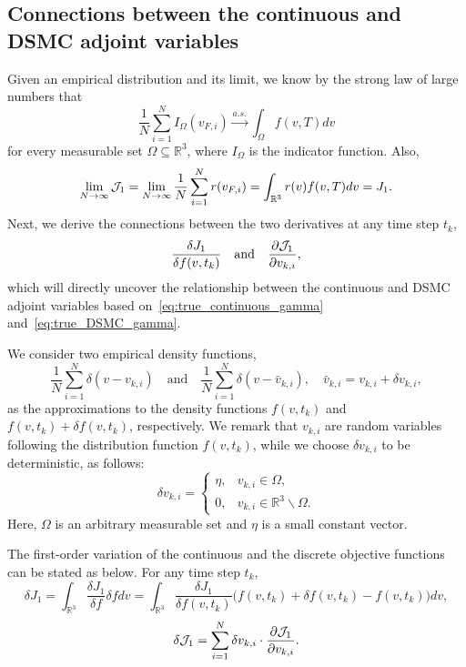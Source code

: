 \documentclass[times,final,nopreprintline]{elsarticle}
\newcommand{\bbR}{\mathbb R} \newcommand{\bbS}{\mathbb S}
\newcommand{\Rthree}{{\bbR^3}}
\begin{document}


\subsection{Connections between the continuous and DSMC adjoint variables}\label{sec:connections}
Given an empirical distribution and its limit, we know by the strong law of large numbers that
\begin{equation*}%
\frac{1}{N}\sum_{i=1}^N I_\Omega(v_{F,i}) \xrightarrow[]{a.s.} \int_\Omega f(v,T) dv
\end{equation*}
for every measurable set $\Omega\subseteq \Rthree$, where $I_\Omega$ is the indicator function. Also,
\begin{equation*}
\lim_{N\rightarrow \infty}\cJ_1 =\lim_{N\rightarrow \infty}\frac{1}{N}\sum_{i=1}^N r(v_{F,i}) = \int_{\Rthree} r(v)f(v,T)dv = J_1.
\end{equation*}
Next, we derive the connections between the two derivatives at any time step $t_k$,
$$
\frac{\delta J_1}{\delta f(v,t_k)} \quad\text{and}\quad \frac{\partial \mathcal J_1}{\partial v_{k,i}},
$$
which will directly uncover the relationship between the continuous and DSMC adjoint variables based on~\eqref{eq:true_continuous_gamma} and~\eqref{eq:true_DSMC_gamma}.



We consider two empirical density functions,
$$ \frac{1}{N} \sum_{i=1}^N \delta(v-v_{k,i})\quad\text{and}\quad \frac{1}{N} \sum_{i=1}^N \delta(v-\bar v_{k,i}),\quad \bar v_{k,i} = v_{k,i} + \delta v_{k,i},$$ 
as the approximations to the density functions $f(v,t_k)$ and $f(v,t_k) +\delta f(v,t_k)$, respectively. We remark that $v_{k,i}$ are random variables following the distribution function $f(v,t_k)$, while we choose $\delta v_{k,i}$ to be  deterministic, as follows:
\begin{equation*}
    \delta v_{k,i} = \begin{cases}
    \eta, & v_{k,i}\in \Omega,\\
    0, & v_{k,i}\in \Rthree \backslash \Omega.
    \end{cases}
\end{equation*}
Here, $\Omega$ is an arbitrary measurable set and $\eta$ is a small constant vector. 

The first-order variation of the continuous and the discrete objective functions can be stated as below. For any time step $t_k$,
\begin{equation} \label{eq:dJ0}
    \delta J_1 = \int_\Rthree \frac{\delta J_1}{\delta f}  \delta f dv= \int_\Rthree \frac{\delta J_1}{\delta f(v,t_k)} \bigg( f(v,t_k) +\delta f(v,t_k) - f(v,t_k) \bigg) dv,
\end{equation}
\begin{equation}\label{eq:dJ1}
\delta \mathcal J_1 =  \sum_{i=1}^N \delta v_{k,i} \cdot \frac{\partial \mathcal J_1}{\partial v_{k,i}}.
\end{equation}
\end{document}
